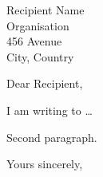 \documentclass[11pt]{letter}
\begin{document}
\begin{letter}{Recipient Name \\ Organisation \\ 456 Avenue \\ City, Country}

\opening{Dear Recipient,}

I am writing to \ldots

Second paragraph.

\closing{Yours sincerely,}

\end{letter}
\end{document}
